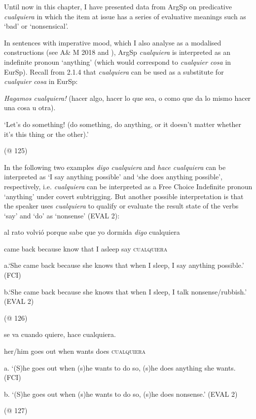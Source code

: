 \documentclass[output=paper]{langscibook}
\begin{document}
Until now in this chapter, I have presented data from ArgSp on predicative \textit{cualquiera} in which the item at issue has a series of evaluative meanings such as ‘bad’ or ‘nonsensical’. 

  In sentences with imperative mood, which I also analyse as a modalised constructions (see A\& M 2018 and ), ArgSp \textit{cualquiera} is interpreted as an indefinite pronoun ‘anything’ (which would correspond to \textit{cualquier cosa} in EurSp). Recall from 2.1.4 that \textit{cualquiera} can be used as a substitute for \textit{cualquier cosa} in EurSp:

    \textit{Hagamos cualquiera!} (hacer algo, hacer lo que sea, o como que da lo mismo hacer una cosa u otra).

    ‘Let’s do something! (do something, do anything, or it doesn’t matter whether it’s this thing or the other).’

(@ 125) 

In the following two examples \textit{digo cualquiera} and \textit{hace cualquiera} can be interpreted as ‘I say anything possible’ and ‘she does anything possible’, respectively, i.e. \textit{cualquiera} can be interpreted as a Free Choice Indefinite pronoun ‘anything’ under covert subtrigging. But another possible interpretation is that the speaker uses \textit{cualquiera} to qualify or evaluate the result state of the verbs ‘say’ and ‘do’ as ‘nonsense’ (EVAL 2):

    al  rato  volvió  porque  sabe  que  yo  dormida  \textit{digo} cualquiera

        came back  because  know  that  I  asleep  say  \textsc{cualquiera}

    a.‘She came back because she knows that when I sleep, I say anything possible.’ (FCI)

b.‘She came back because she knows that when I sleep, I talk nonsense/rubbish.’ (EVAL 2)

    (@ 126)

    se  va  cuando  quiere,  hace  cualquiera.

    her/him  goes out  when  wants  does  \textsc{cualquiera}

    a. ‘(S)he goes out when (s)he wants to do so, (s)he does anything she wants.        (FCI)

b. ‘(S)he goes out when (s)he wants to do so, (s)he does nonsense.’                       (EVAL 2)

    (@ 127)
\end{document}
